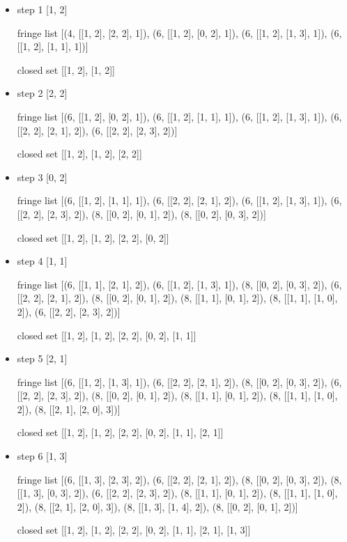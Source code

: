 \documentclass[aps,letterpaper,10pt]{revtex4}
\begin{document}
\begin{itemize}
	\item step 1
[1, 2]


fringe list
[(4, [[1, 2], [2, 2], 1]), (6, [[1, 2], [0, 2], 1]), (6, [[1, 2], [1, 3], 1]), (6, [[1, 2], [1, 1], 1])]


closed set
[[1, 2], [1, 2]]


\item step 2
[2, 2]


fringe list
[(6, [[1, 2], [0, 2], 1]), (6, [[1, 2], [1, 1], 1]), (6, [[1, 2], [1, 3], 1]), (6, [[2, 2], [2, 1], 2]), (6, [[2, 2], [2, 3], 2])]


closed set
[[1, 2], [1, 2], [2, 2]]


\item step 3
[0, 2]


fringe list
[(6, [[1, 2], [1, 1], 1]), (6, [[2, 2], [2, 1], 2]), (6, [[1, 2], [1, 3], 1]), (6, [[2, 2], [2, 3], 2]), (8, [[0, 2], [0, 1], 2]), (8, [[0, 2], [0, 3], 2])]


closed set
[[1, 2], [1, 2], [2, 2], [0, 2]]


\item step 4
[1, 1]


fringe list
[(6, [[1, 1], [2, 1], 2]), (6, [[1, 2], [1, 3], 1]), (8, [[0, 2], [0, 3], 2]), (6, [[2, 2], [2, 1], 2]), (8, [[0, 2], [0, 1], 2]), (8, [[1, 1], [0, 1], 2]), (8, [[1, 1], 
[1, 0], 2]), (6, [[2, 2], [2, 3], 2])]


closed set
[[1, 2], [1, 2], [2, 2], [0, 2], [1, 1]]


\item step 5
[2, 1]


fringe list
[(6, [[1, 2], [1, 3], 1]), (6, [[2, 2], [2, 1], 2]), (8, [[0, 2], [0, 3], 2]), (6, [[2, 2], [2, 3], 2]), (8, [[0, 2], [0, 1], 2]), (8, [[1, 1], [0, 1], 2]), (8, [[1, 1], 
[1, 0], 2]), (8, [[2, 1], [2, 0], 3])]


closed set
[[1, 2], [1, 2], [2, 2], [0, 2], [1, 1], [2, 1]]


\item step 6
[1, 3]


fringe list
[(6, [[1, 3], [2, 3], 2]), (6, [[2, 2], [2, 1], 2]), (8, [[0, 2], [0, 3], 2]), (8, [[1, 3], [0, 3], 2]), (6, [[2, 2], [2, 3], 2]), (8, [[1, 1], [0, 1], 2]), (8, [[1, 1], 
[1, 0], 2]), (8, [[2, 1], [2, 0], 3]), (8, [[1, 3], [1, 4], 2]), (8, [[0, 2], [0, 1], 2])]


closed set
[[1, 2], [1, 2], [2, 2], [0, 2], [1, 1], [2, 1], [1, 3]]



\end{itemize}
\end{document}
